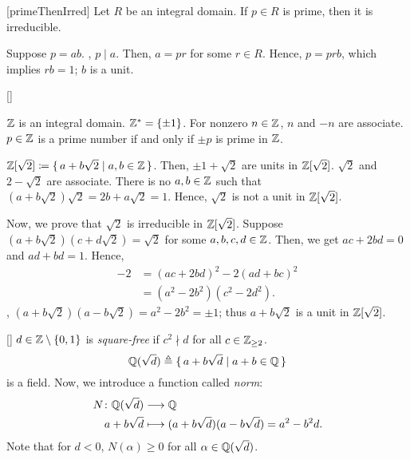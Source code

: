 \documentclass[../modern_algebra_2.tex]{subfiles}
\begin{document}
\begin{Theorem}{}[primeThenIrred]
    Let \(R\) be an integral domain.
    If \(p \in R\) is prime, then it is irreducible.
\end{Theorem}
\begin{myproof}[Proof]
    Suppose \(p = ab\).
    \WLOG, \(p \mid a\).
    Then, \(a = pr\) for some \(r \in R\).
    Hence, \(p = prb\), which implies \(rb = 1\);
    \(b\) is a unit.
\end{myproof}

\begin{Example}{}[]
    \begin{enumerate}[label=(\roman*), ref=\protect{(\roman*)}, listparindent=\parindent]
        \ii
        \(\ZZ\) is an integral domain. \(\ZZ^\ast = \{\pm 1\}\).
        For nonzero \(n \in \ZZ\), \(n\) and \(-n\) are associate.
        \(p \in \ZZ\) is a prime number if and only if \(\pm p\) is prime in \(\ZZ\).

        \ii
        \(\ZZ{}[\sqrt{2}] \coloneqq \{\,a + b\sqrt{2} \mid a, b \in \ZZ\,\}\).
        Then, \(\pm 1 + \sqrt{2}\) are units in \(\ZZ{}[\sqrt{2}]\).
        \(\sqrt{2}\) and \(2 - \sqrt{2}\) are associate.
        There is no \(a, b \in \ZZ\) such that \((a + b\sqrt{2})\sqrt{2} = 2b + a\sqrt{2} = 1\).
        Hence, \(\sqrt{2}\) is not a unit in \(\ZZ{}[\sqrt{2}]\).

        Now, we prove that \(\sqrt{2}\) is irreducible in \(\ZZ{}[\sqrt{2}]\).
        Suppose \((a + b\sqrt{2})(c + d\sqrt{2}) = \sqrt{2}\)
        for some \(a, b, c, d \in \ZZ\).
        Then, we get \(ac + 2bd = 0\) and \(ad + bd = 1\).
        Hence,
        \begin{align*}
            -2
            &= (ac + 2bd)^2 - 2(ad + bc)^2 \\
            &= (a^2 - 2b^2)(c^2 - 2d^2).
        \end{align*}
        \WLOG, \((a + b\sqrt{2})(a - b\sqrt{2}) = a^2 - 2b^2 = \pm 1\);
        thus \(a + b\sqrt{2}\) is a unit in \(\ZZ{}[\sqrt{2}]\).
    \end{enumerate}
\end{Example}

\begin{Definition}{}[]
    \(d \in \ZZ \setminus \{0, 1\}\) is \emph{square-free} if \(c^2 \nmid d\) for all
    \(c \in \ZZ_{\ge 2}\).
    \[
        \QQ(\sqrt{d}) \triangleq \{\,a + b\sqrt{d} \mid a + b \in \QQ\,\}
    \]
    is a field. Now, we introduce a function called \emph{norm}:
    \begin{align*}
        N \colon \QQ(\sqrt{d}) &\longrightarrow \QQ \\
        a + b\sqrt{d} &\longmapsto (a + b\sqrt{d})(a - b\sqrt{d}) = a^2 - b^2d.
    \end{align*}
    Note that for \(d < 0\), \(N(\alpha) \ge 0\) for all \(\alpha \in \QQ(\sqrt{d})\).
\end{Definition}
\end{document}
